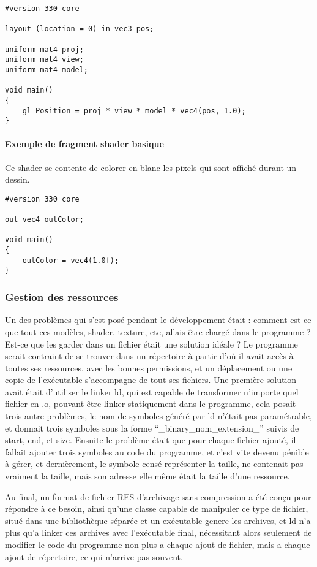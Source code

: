\documentclass[11pt, a4paper, titlepage]{article}
\begin{document}
\begin{lstlisting}
#version 330 core

layout (location = 0) in vec3 pos;

uniform mat4 proj;
uniform mat4 view;
uniform mat4 model;

void main()
{
    gl_Position = proj * view * model * vec4(pos, 1.0);
}
\end{lstlisting}

\paragraph{Exemple de fragment shader basique\\}
Ce shader se contente de colorer en blanc les pixels qui sont affiché durant un dessin.

\begin{lstlisting}
#version 330 core

out vec4 outColor;

void main()
{
    outColor = vec4(1.0f);
}

\end{lstlisting}
\subsubsection{Gestion des ressources}

Un des problèmes qui s'est posé pendant le développement était : comment est-ce que tout ces modèles, shader, texture, etc, allais être chargé dans le programme ?
Est-ce que les garder dans un fichier était une solution idéale ? Le programme serait contraint de se trouver dans un répertoire à partir d'où il avait accès 
à toutes ses ressources, avec les bonnes permissions, et un déplacement ou une copie de l'exécutable s'accompagne de tout ses fichiers.
Une première solution avait était d'utiliser le linker ld, qui est capable de transformer n'importe quel fichier en .o, pouvant être linker statiquement dans
 le programme, cela posait trois autre problèmes, le nom de symboles généré par ld n'était pas paramétrable, et donnait trois symboles sous la forme
 ``\_binary\_nom\_extension\_'' suivis de start, end, et size. Ensuite le problème était que pour chaque fichier ajouté, il fallait ajouter trois symboles au code du 
programme, et c'est vite devenu pénible à gérer, et dernièrement, le symbole censé représenter la taille, ne contenait pas vraiment la taille, mais son adresse 
elle même était la taille d'une ressource.

Au final, un format de fichier RES d'archivage sans compression a été conçu pour répondre à ce besoin, ainsi qu'une classe capable de manipuler ce type
 de fichier, situé dans une bibliothèque séparée et un exécutable genere les archives, et ld n'a plus qu'a linker ces archives avec l'exécutable final, 
nécessitant alors seulement de modifier le code du programme non plus a chaque ajout de fichier, mais a chaque ajout de répertoire, ce qui n'arrive pas souvent.
\end{document}
